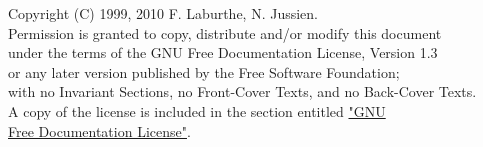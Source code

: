 \begin{myquote}
Copyright (C)  1999, 2010  F. Laburthe, N. Jussien.\\
Permission is granted to copy, distribute and/or modify this document\\
under the terms of the GNU Free Documentation License, Version 1.3\\
or any later version published by the Free Software Foundation;\\
with no Invariant Sections, no Front-Cover Texts, and no Back-Cover Texts.\\
A copy of the license is included in the section entitled \hyperlink{licence}{"GNU \\Free Documentation License"}.
\end{myquote}
